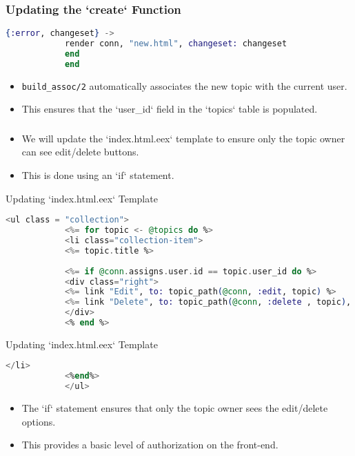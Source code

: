 \documentclass[aspectratio=169, table]{beamer}
\begin{document}
	\begin{frame}[fragile]
		\frametitle{Updating the `create` Function}
		\begin{lstlisting}[language=Elixir]
			{:error, changeset} -> 
			render conn, "new.html", changeset: changeset
			end
			end
		\end{lstlisting}
		\begin{itemize}
			\item \texttt{build\_assoc/2} automatically associates the new topic with the current user.
			\item This ensures that the `user\_id` field in the `topics` table is populated.
		\end{itemize}
	\end{frame}
	
	\begin{frame}
		\frametitle{}
		\begin{itemize}
			\item We will update the `index.html.eex` template to ensure only the topic owner can see edit/delete buttons.
			\item This is done using an `if` statement.
		\end{itemize}
	\end{frame}
	
	\begin{frame}[fragile]{Updating `index.html.eex` Template}
		\begin{lstlisting}[language=Elixir]
			<ul class = "collection">
			<%= for topic <- @topics do %>
			<li class="collection-item"> 
			<%= topic.title %>
			
			<%= if @conn.assigns.user.id == topic.user_id do %>
			<div class="right">
			<%= link "Edit", to: topic_path(@conn, :edit, topic) %>
			<%= link "Delete", to: topic_path(@conn, :delete , topic), method: :delete %>
			</div>
			<% end %>
		\end{lstlisting}
	\end{frame}
	
	\begin{frame}[fragile]{Updating `index.html.eex` Template}
		\begin{lstlisting}[language=Elixir]
			</li>
			<%end%>
			</ul>
		\end{lstlisting}
		\begin{itemize}
			\item The `if` statement ensures that only the topic owner sees the edit/delete options.
			\item This provides a basic level of authorization on the front-end.
		\end{itemize}
	\end{frame}
	
\end{document}
